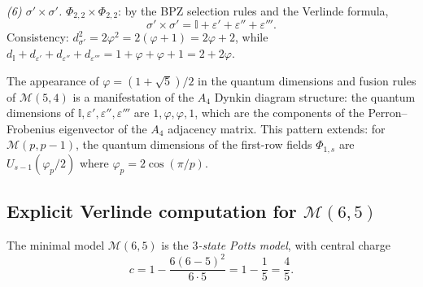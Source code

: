 \begin{computation}
\emph{(6) $\sigma' \times \sigma'$.}
$\Phi_{2,2}\times\Phi_{2,2}$: by the BPZ selection rules and the Verlinde formula,
\begin{equation}\label{eq:fusion-5-4-sigp-sigp}
\sigma' \times \sigma' = \mathbb{I} + \varepsilon' + \varepsilon'' + \varepsilon'''.
\end{equation}
Consistency: $d_{\sigma'}^2 = 2\varphi^2 = 2(\varphi+1) = 2\varphi + 2$, while
$d_{\mathbb{I}} + d_{\varepsilon'} + d_{\varepsilon''} + d_{\varepsilon'''} = 1 + \varphi + \varphi + 1 = 2 + 2\varphi$.
\end{computation}

\begin{remark}\label{rem:golden-ratio-5-4}
The appearance of $\varphi = (1+\sqrt{5})/2$ in the quantum dimensions and
fusion rules of $\mathcal{M}(5,4)$ is a manifestation of the $A_4$ Dynkin
diagram structure: the quantum dimensions of
$\mathbb{I}, \varepsilon', \varepsilon'', \varepsilon'''$ are
$1, \varphi, \varphi, 1$, which are the components of the Perron--Frobenius
eigenvector of the $A_4$ adjacency matrix.  This pattern extends: for
$\mathcal{M}(p,p{-}1)$, the quantum dimensions of the first-row fields
$\Phi_{1,s}$ are $U_{s-1}(\varphi_p/2)$ where $\varphi_p = 2\cos(\pi/p)$.
\end{remark}

\subsection{\texorpdfstring{Explicit Verlinde computation for $\mathcal{M}(6,5)$}{Explicit Verlinde computation for M(6,5)}}
\label{subsec:verlinde-6-5}

The minimal model $\mathcal{M}(6,5)$ is the \emph{$3$-state Potts model},
with central charge
\begin{equation}\label{eq:c-6-5}
c = 1 - \frac{6(6-5)^2}{6 \cdot 5} = 1 - \frac{1}{5} = \frac{4}{5}.
\end{equation}


